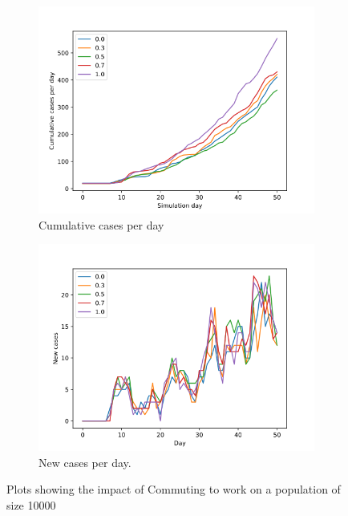 \documentclass[runningheads]{llncs}
\begin{document}
\begin{figure}[h!]
	\centering
	\begin{subfigure}[b]{0.7\linewidth}
		\includegraphics[width=\textwidth]{population10000_Cumulative.png}
		\caption{Cumulative cases per day} 
	\end{subfigure}
	\begin{subfigure}[b]{0.7\linewidth}
		\includegraphics[width=\textwidth]{population10000_cases_per_day.png}
		\caption{New cases per day.} 
	\end{subfigure}
	\caption{Plots showing the impact of Commuting to work on a population of size 10000}
	\label{VaccinePlot}
\end{figure}
\end{document}
